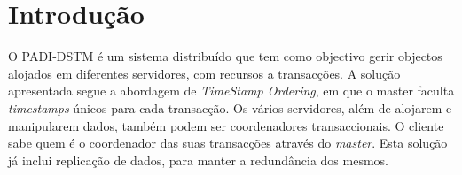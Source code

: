 \section{Introdução}

O PADI-DSTM é um sistema distribuído que tem como objectivo gerir objectos alojados em diferentes servidores, com recursos a transacções. A solução apresentada segue a abordagem de \textit{TimeStamp Ordering}, em que o master faculta \textit{timestamps} únicos para cada transacção. Os vários servidores, além de alojarem e manipularem dados, também podem ser coordenadores transaccionais. O cliente sabe quem é o coordenador das suas transacções através do \textit{master}. Esta solução já inclui replicação de dados, para manter a redundância dos mesmos.